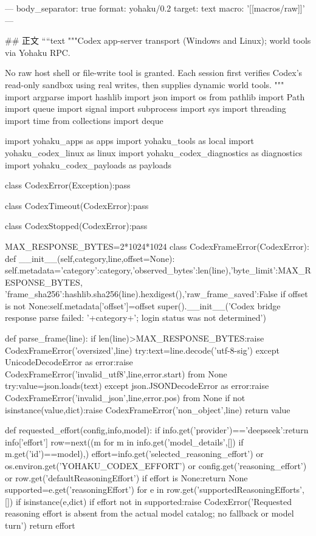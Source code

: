 ---
body_separator: true
format: yohaku/0.2
target: text
macro: '[[macros/raw]]'
---

## 正文
````text
"""Codex app-server transport (Windows and Linux); world tools via Yohaku RPC.

No raw host shell or file-write tool is granted. Each session first verifies
Codex's read-only sandbox using real writes, then supplies dynamic world tools.
"""
import argparse
import hashlib
import json
import os
from pathlib import Path
import queue
import signal
import subprocess
import sys
import threading
import time
from collections import deque

import yohaku_apps as apps
import yohaku_tools as local
import yohaku_codex_linux as linux
import yohaku_codex_diagnostics as diagnostics
import yohaku_codex_payloads as payloads

class CodexError(Exception):pass

class CodexTimeout(CodexError):pass

class CodexStopped(CodexError):pass

MAX_RESPONSE_BYTES=2*1024*1024
class CodexFrameError(CodexError):
    def __init__(self,category,line,offset=None):
        self.metadata={'category':category,'observed_bytes':len(line),'byte_limit':MAX_RESPONSE_BYTES,
                       'frame_sha256':hashlib.sha256(line).hexdigest(),'raw_frame_saved':False}
        if offset is not None:self.metadata['offset']=offset
        super().__init__('Codex bridge response parse failed: '+category+'; login status was not determined')

def parse_frame(line):
    if len(line)>MAX_RESPONSE_BYTES:raise CodexFrameError('oversized',line)
    try:text=line.decode('utf-8-sig')
    except UnicodeDecodeError as error:raise CodexFrameError('invalid_utf8',line,error.start) from None
    try:value=json.loads(text)
    except json.JSONDecodeError as error:raise CodexFrameError('invalid_json',line,error.pos) from None
    if not isinstance(value,dict):raise CodexFrameError('non_object',line)
    return value

def requested_effort(config,info,model):
    if info.get('provider')=='deepseek':return info['effort']
    row=next((m for m in info.get('model_details',[]) if m.get('id')==model),{})
    effort=info.get('selected_reasoning_effort') or os.environ.get('YOHAKU_CODEX_EFFORT') or config.get('reasoning_effort') or row.get('defaultReasoningEffort')
    if effort is None:return None
    supported={e.get('reasoningEffort') for e in row.get('supportedReasoningEfforts',[]) if isinstance(e,dict)}
    if effort not in supported:raise CodexError('Requested reasoning effort is absent from the actual model catalog; no fallback or model turn')
    return effort

